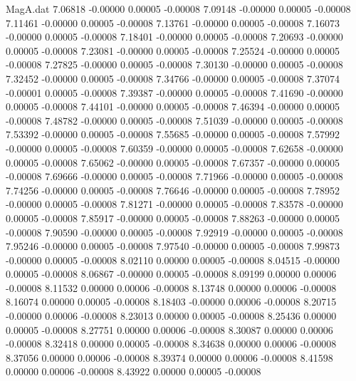 \begin{filecontents}{MagA.dat}
   7.06818   -0.00000    0.00005   -0.00008
   7.09148   -0.00000    0.00005   -0.00008
   7.11461   -0.00000    0.00005   -0.00008
   7.13761   -0.00000    0.00005   -0.00008
   7.16073   -0.00000    0.00005   -0.00008
   7.18401   -0.00000    0.00005   -0.00008
   7.20693   -0.00000    0.00005   -0.00008
   7.23081   -0.00000    0.00005   -0.00008
   7.25524   -0.00000    0.00005   -0.00008
   7.27825   -0.00000    0.00005   -0.00008
   7.30130   -0.00000    0.00005   -0.00008
   7.32452   -0.00000    0.00005   -0.00008
   7.34766   -0.00000    0.00005   -0.00008
   7.37074   -0.00001    0.00005   -0.00008
   7.39387   -0.00000    0.00005   -0.00008
   7.41690   -0.00000    0.00005   -0.00008
   7.44101   -0.00000    0.00005   -0.00008
   7.46394   -0.00000    0.00005   -0.00008
   7.48782   -0.00000    0.00005   -0.00008
   7.51039   -0.00000    0.00005   -0.00008
   7.53392   -0.00000    0.00005   -0.00008
   7.55685   -0.00000    0.00005   -0.00008
   7.57992   -0.00000    0.00005   -0.00008
   7.60359   -0.00000    0.00005   -0.00008
   7.62658   -0.00000    0.00005   -0.00008
   7.65062   -0.00000    0.00005   -0.00008
   7.67357   -0.00000    0.00005   -0.00008
   7.69666   -0.00000    0.00005   -0.00008
   7.71966   -0.00000    0.00005   -0.00008
   7.74256   -0.00000    0.00005   -0.00008
   7.76646   -0.00000    0.00005   -0.00008
   7.78952   -0.00000    0.00005   -0.00008
   7.81271   -0.00000    0.00005   -0.00008
   7.83578   -0.00000    0.00005   -0.00008
   7.85917   -0.00000    0.00005   -0.00008
   7.88263   -0.00000    0.00005   -0.00008
   7.90590   -0.00000    0.00005   -0.00008
   7.92919   -0.00000    0.00005   -0.00008
   7.95246   -0.00000    0.00005   -0.00008
   7.97540   -0.00000    0.00005   -0.00008
   7.99873   -0.00000    0.00005   -0.00008
   8.02110    0.00000    0.00005   -0.00008
   8.04515   -0.00000    0.00005   -0.00008
   8.06867   -0.00000    0.00005   -0.00008
   8.09199    0.00000    0.00006   -0.00008
   8.11532    0.00000    0.00006   -0.00008
   8.13748    0.00000    0.00006   -0.00008
   8.16074    0.00000    0.00005   -0.00008
   8.18403   -0.00000    0.00006   -0.00008
   8.20715   -0.00000    0.00006   -0.00008
   8.23013    0.00000    0.00005   -0.00008
   8.25436    0.00000    0.00005   -0.00008
   8.27751    0.00000    0.00006   -0.00008
   8.30087    0.00000    0.00006   -0.00008
   8.32418    0.00000    0.00005   -0.00008
   8.34638    0.00000    0.00006   -0.00008
   8.37056    0.00000    0.00006   -0.00008
   8.39374    0.00000    0.00006   -0.00008
   8.41598    0.00000    0.00006   -0.00008
   8.43922    0.00000    0.00005   -0.00008

\end{filecontents}

